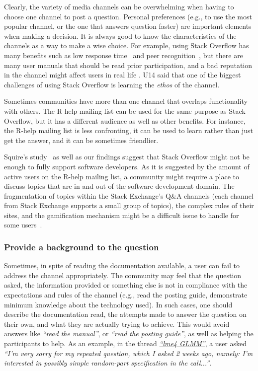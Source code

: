\documentclass{sig-alternate-05-2015}
\begin{document}
		Clearly, the variety of media channels can be overwhelming when having to choose one channel to post a question.
		Personal preferences (e.g., to use the most popular channel, or the one that answers question faster) are important elements when making a decision.
		It is always good to know the characteristics of the channels as a way to make a wise choice.
		For example, using Stack Overflow has many benefits such as low response time~\cite{Mamykina2011} and peer recognition~\cite{Singer2013}, but there are many user manuals that should be read prior participation, and a bad reputation in the channel might affect users in real life \cite{Singer2013}.
		U14 said that one of the biggest challenges of using Stack Overflow is learning the \emph{ethos} of the channel.

		Sometimes communities have more than one channel that overlaps functionality with others.
		The R-help mailing list can be used for the same purpose as Stack Overflow, but it has a different audience as well as other benefits.
		For instance, the R-help mailing list is less confronting, it can be used to learn rather than just get the answer, and it can be sometimes friendlier.

Squire's study~\cite{Squire2015a} as well as our findings suggest that Stack Overflow might not be enough to fully support software developers.
As it is suggested by the amount of active users on the R-help mailing list, a community might require a place to discuss topics that are in and out of the software development domain.
The fragmentation of topics within the Stack Exchange's Q\&A channels (each channel from Stack Exchange supports a small group of topics), the complex rules of their sites, and the gamification mechanism might be a difficult issue to handle for some users~\cite{Vasilescu2013}.

	\subsubsection{Provide a background to the question}

        Sometimes, in spite of reading the documentation available, a user can fail to address the channel appropriately. 
        The community may feel that the question asked, the information provided or something else is not in compliance with the expectations and rules of the channel (e.g., read the posting guide, demonstrate minimum knowledge about the technology used).
		In such cases, one should describe the documentation read, the attempts made to answer the question on their own, and what they are actually trying to achieve.
		This would avoid answers like \textit{``read the manual''}, or \textit{``read the posting guide''}, as well as helping the participants to help.
		As an example, in the thread \textit{\href{https://goo.gl/Gbek3R}{``lme4 GLMM''}}, a user asked \textit{``I'm very sorry for my repeated question, which I asked 2 weeks ago, namely: I'm interested in possibly simple random-part specification in the call...''}.
\end{document}
